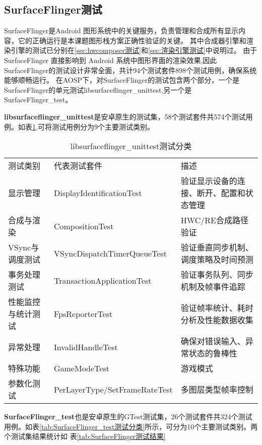\subsection{SurfaceFlinger测试}
SurfaceFlinger是Android 图形系统中的关键服务，负责管理和合成所有显示内容，它的正确运行是本课题图形栈方案正确性验证的关键。
其中合成器引擎和渲染引擎的测试已分别在\ref{sec:hwcomposer测试}和\ref{sec:渲染引擎测试}中说明过。
由于 SurfaceFlinger 直接影响到 Android 系统中图形界面的渲染效果,因此SurfaceFlinger的测试设计非常全面，共计94个测试套件898个测试用例，确保系统能够顺畅运行。
在AOSP下，对SurfaceFlinger的测试包含两个部分，一个是SurfaceFlinger的单元测试libsurfaceflinger\_unittest,另一个是SurfaceFlinger\_test。

\textbf{libsurfaceflinger\_unittest}是安卓原生的测试集，58个测试套件共574个测试用例。如表\ref{tab:libsurfaceflinger_unittest测试分类},可将测试用例分为9个主要测试类别。

\begin{table}[h]
    \centering
    \caption{libsurfaceflinger\_unittest测试分类}
    \label{tab:libsurfaceflinger_unittest测试分类}
    \begin{tabular}{lll}
        \toprule
        测试类别 & 代表测试套件	& 描述 \\
        显示管理 & DisplayIdentificationTest & 验证显示设备的连接、断开、配置和状态管理 \\
        合成与渲染 & CompositionTest & HWC/RE合成路径验证 \\
        VSync与调度测试 & VSyncDispatchTimerQueueTest & 验证垂直同步机制、调度策略及时间预测 \\
        事务处理测试 & TransactionApplicationTest & 验证事务队列、同步机制及帧事件追踪 \\
        性能监控与统计测试 & FpsReporterTest & 验证帧率统计、耗时分析及性能数据收集 \\
        异常处理 & InvalidHandleTest & 确保对错误输入、异常状态的鲁棒性 \\
        特殊功能 & GameModeTest & 游戏模式 \\  
        参数化测试 &  PerLayerType/SetFrameRateTest & 多图层类型帧率控制 \\
        \bottomrule
    \end{tabular}
    \note{}
\end{table}

\textbf{SurfaceFlinger\_test}也是安卓原生的GTest测试集，26个测试套件共324个测试用例。如表\ref{tab:SurfaceFlinger_test测试分类}所示，可分为10个主要测试类别。两个测试集结果统计如
表\ref{tab:SurfaceFlinger测试结果}

